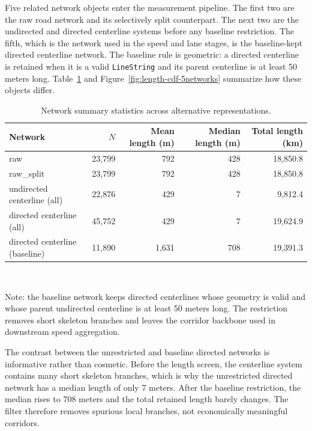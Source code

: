 \documentclass[12pt]{article}
\begin{document}
	Five related network objects enter the measurement pipeline. The first two are the raw road network and its selectively split counterpart. The next two are the undirected and directed centerline systems before any baseline restriction. The fifth, which is the network used in the speed and lane stages, is the baseline-kept directed centerline network. The baseline rule is geometric: a directed centerline is retained when it is a valid \texttt{LineString} and its parent centerline is at least 50 meters long. Table~\ref{tab:network-summary} and Figure~\ref{fig:length-cdf-5networks} summarize how these objects differ.
	
	\begin{table}[h!]
		\centering
		\caption{Network summary statistics across alternative representations.}
		\label{tab:network-summary}
		\begin{tabular}{l r r r r}
			\toprule
			Network & $N$ & Mean length (m) & Median length (m) & Total length (km) \\
			\midrule
			raw & 23,799 & 792 & 428 & 18,850.8 \\
			raw\_split & 23,799 & 792 & 428 & 18,850.8 \\
			undirected centerline (all) & 22,876 & 429 & 7 & 9,812.4 \\
			directed centerline (all) & 45,752 & 429 & 7 & 19,624.9 \\
			directed centerline (baseline) & 11,890 & 1,631 & 708 & 19,391.3 \\
			\bottomrule
		\end{tabular} \\
		\vspace{0.3em}
		{\footnotesize\raggedright
			Note: the baseline network keeps directed centerlines whose geometry is valid and whose parent undirected centerline is at least 50 meters long. The restriction removes short skeleton branches and leaves the corridor backbone used in downstream speed aggregation.
		}
	\end{table}
	
	The contrast between the unrestricted and baseline directed networks is informative rather than cosmetic. Before the length screen, the centerline system contains many short skeleton branches, which is why the unrestricted directed network has a median length of only 7 meters. After the baseline restriction, the median rises to 708 meters and the total retained length barely changes. The filter therefore removes spurious local branches, not economically meaningful corridors.
	
\end{document}
